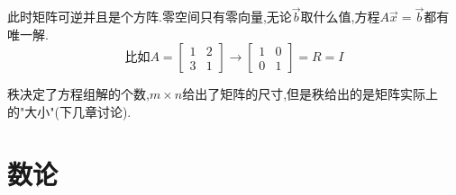 \documentclass[UTF8,12pt]{ctexbook}
\begin{document}
{{{{{\begin{itemize}
{          此时矩阵可逆并且是个方阵.零空间只有零向量,无论$\vec{b}$取什么值,方程$A\vec{x} = \vec{b}$都有唯一解.
          $$
            \mbox{比如}A = \begin{bmatrix}
              1 & 2 \\
              3 & 1
            \end{bmatrix}
            \to
            \begin{bmatrix}
              1 & 0 \\
              0 & 1
            \end{bmatrix}
            =
            R
            =
            I
          $$
          }
  \end{itemize}










  秩决定了方程组解的个数,$m \times n$给出了矩阵的尺寸,但是秩给出的是矩阵实际上的"大小"(下几章讨论).
}%

}%

}%

\section{数论}{

}}}
\end{document}
